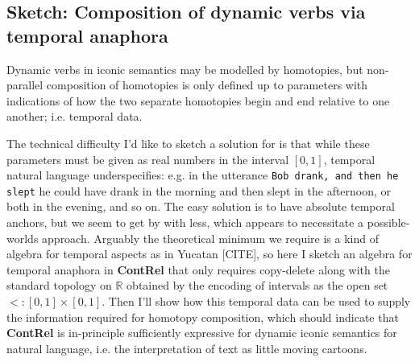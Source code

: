 \subsection{Sketch: Composition of dynamic verbs via temporal anaphora}
Dynamic verbs in iconic semantics may be modelled by homotopies, but non-parallel composition of homotopies is only defined up to parameters with indications of how the two separate homotopies begin and end relative to one another; i.e. temporal data.

\begin{example}

\end{example}

The technical difficulty I'd like to sketch a solution for is that while these parameters must be given as real numbers in the interval $[0,1]$, temporal natural language underspecifies: e.g. in the utterance \texttt{Bob drank, and then he slept} he could have drank in the morning and then slept in the afternoon, or both in the evening, and so on. The easy solution is to have absolute temporal anchors, but we seem to get by with less, which appears to necessitate a possible-worlds approach. Arguably the theoretical minimum we require is a kind of algebra for temporal aspects as in Yucatan [CITE], so here I sketch an algebra for temporal anaphora in \textbf{ContRel} that only requires copy-delete along with the standard topology on $\mathbb{R}$ obtained by the encoding of intervals as the open set $<: [0,1] \times [0,1]$. Then I'll show how this temporal data can be used to supply the information required for homotopy composition, which should indicate that \textbf{ContRel} is in-principle sufficiently expressive for dynamic iconic semantics for natural language, i.e. the interpretation of text as little moving cartoons.

